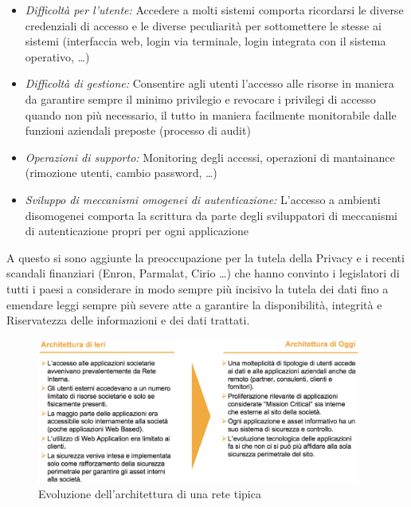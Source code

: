 \begin{itemize}
\item \textit{Difficoltà per l'utente:} Accedere a molti sistemi comporta
ricordarsi le diverse credenziali di accesso e le diverse peculiarità per
sottomettere le stesse ai sistemi (interfaccia web, login via terminale, login
integrata con il sistema operativo, \ldots)
\item \textit{Difficoltà di gestione:} Consentire agli utenti l'accesso alle
risorse in maniera da garantire sempre il minimo privilegio e revocare i
privilegi di accesso quando non più necessario, il tutto in maniera facilmente
monitorabile dalle funzioni aziendali preposte (processo di audit)
\item \textit{Operazioni di supporto:} Monitoring degli accessi, operazioni di
mantainance (rimozione utenti, cambio password, \ldots)
\item \textit{Sviluppo di meccanismi omogenei di autenticazione:} L'accesso a
ambienti disomogenei comporta la scrittura da parte degli sviluppatori di
meccanismi di autenticazione propri per ogni applicazione
\end{itemize}

A questo si sono aggiunte la preoccupazione per la tutela della Privacy e i
recenti scandali finanziari (Enron, Parmalat, Cirio \ldots) che hanno convinto i
legislatori di tutti i paesi a considerare in modo sempre più incisivo la tutela
dei dati fino a emendare leggi sempre più severe atte a garantire la
disponibilità, integrità e Riservatezza delle informazioni e dei dati trattati.

\begin{figure}[htbp]
\includegraphics[width=0.95\textwidth]{img/ConfrontoArchitetture.eps}
\caption{Evoluzione dell'architettura di una rete tipica}\label{ConfrontoArchitetture}
\end{figure}

